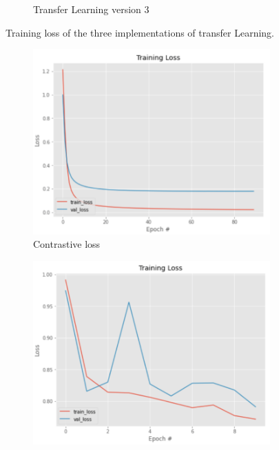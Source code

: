 \begin{figure}[h]
\begin{subfigure}[b]{0.48\linewidth}
   \caption{Transfer Learning version 3}
   \label{fig:tri_loss_2}
  \end{subfigure}
  \hfill
    \caption{Training loss of the three implementations of transfer Learning.}
    \label{fig:tertrainloss}
\end{figure}


\begin{figure}[h]
  \centering
  \begin{subfigure}[b]{0.48\linewidth}
  \includegraphics[width=\linewidth]{figs/con_loss.png}
  \caption{Contrastive loss}
  \label{fig:con_loss}
  \end{subfigure}
  \hfill
   \begin{subfigure}[b]{0.48\linewidth}
   \includegraphics[width=\linewidth]{figs/tri_loss.png}

\end{subfigure}
\end{figure}

